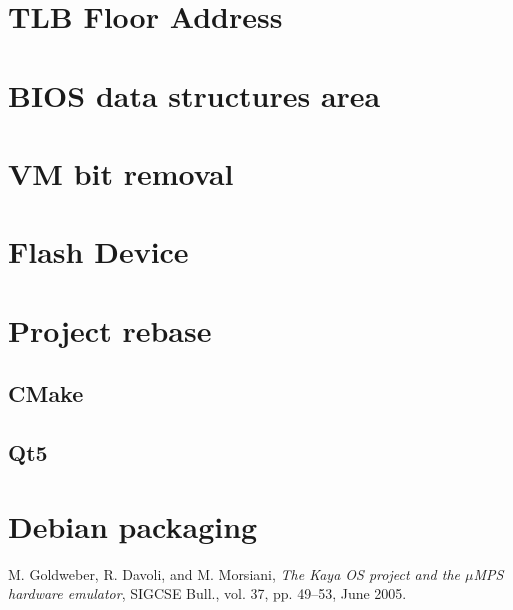 \documentclass[12pt,a4paper,openright,twoside]{report}
\begin{document}
\chapter{TLB Floor Address}
\lhead[\fancyplain{}{\bfseries\thepage}]{\fancyplain{}{\bfseries\rightmark}}
\chapter{BIOS data structures area}
\lhead[\fancyplain{}{\bfseries\thepage}]{\fancyplain{}{\bfseries\rightmark}}
\chapter{VM bit removal}
\lhead[\fancyplain{}{\bfseries\thepage}]{\fancyplain{}{\bfseries\rightmark}}
\chapter{Flash Device}
\lhead[\fancyplain{}{\bfseries\thepage}]{\fancyplain{}{\bfseries\rightmark}}
\chapter{Project rebase}
\section{CMake}
\section{Qt5}
\lhead[\fancyplain{}{\bfseries\thepage}]{\fancyplain{}{\bfseries\rightmark}}
\chapter{Debian packaging}
\lhead[\fancyplain{}{\bfseries\thepage}]{\fancyplain{}{\bfseries\rightmark}}
\begin{thebibliography}{99}
  M. Goldweber, R. Davoli, and M. Morsiani,
  \textit{The Kaya OS project and the $\mu$MPS hardware emulator},
   SIGCSE Bull.,
   vol. 37, pp. 49–53,
   June 2005.
\end{thebibliography}
\end{document}
